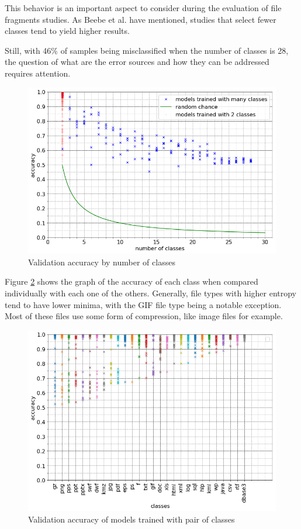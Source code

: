 This behavior is an important aspect to consider during the evaluation of file fragments studies. As Beebe et al. \cite{beebe_sceadan:_2013} have mentioned, studies that select fewer classes tend to yield higher results. 

Still, with 46\%  of samples being misclassified when the number of classes is 28, the question of what are the error sources and how they can be addressed requires attention.

\noindent
\begin{figure}[htb!]
\centering\includegraphics[width=1.0\textwidth]{content/nclasses.png}
\caption{\label{fig:nclasses}Validation accuracy by number of classes}%
\end{figure}

Figure \ref{fig:dual} shows the graph of the accuracy of each class when compared individually with each one of the others. Generally, file types with higher entropy tend to have lower minima, with the GIF  file type being a notable exception. Most of these files use some form of compression, like image files for example. 


\noindent
\begin{figure}[htb!]
\centering\includegraphics[width=1.0\textwidth]{content/dual.png}
\caption{\label{fig:dual}Validation accuracy of models trained with pair of classes}%
\end{figure}


